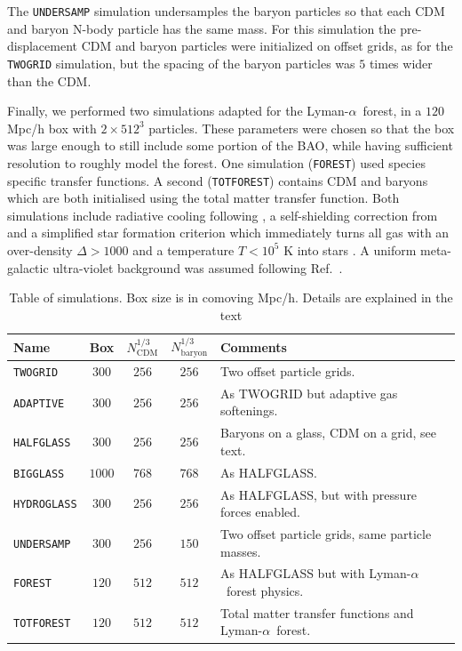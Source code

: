 \documentclass[a4paper,11pt]{article}
\newcommand{\Lya}{Lyman-$\alpha$}
\begin{document}
The \texttt{UNDERSAMP} simulation undersamples the baryon particles so that each CDM and baryon N-body particle has the same mass. For this simulation the pre-displacement CDM and baryon particles were initialized on offset grids, as for the \texttt{TWOGRID} simulation, but the spacing of the baryon particles was $5$ times wider than the CDM.

Finally, we performed two simulations adapted for the \Lya~forest, in a $120$ Mpc/h box with $2\times 512^3$ particles. These parameters were chosen so that the box was large enough to still include some portion of the BAO, while having sufficient resolution to roughly model the forest. One simulation (\texttt{FOREST}) used species specific transfer functions. A second (\texttt{TOTFOREST}) contains CDM and baryons which are both initialised using the total matter transfer function. Both simulations include radiative cooling following \cite{Katz:1996}, a self-shielding correction from \cite{Rahmati:2013} and a simplified star formation criterion which immediately turns all gas with an over-density $\Delta > 1000$ and a temperature $T < 10^5$ K into stars \cite{Viel:2004}. A uniform meta-galactic ultra-violet background was assumed following Ref.~\cite{Puchwein:2018}.

\begin{table}
\begin{center}
\begin{tabular}{|l|c|c|c|l|}
\hline
Name & Box & $N_\mathrm{CDM}^{1/3}$ & $N_\mathrm{baryon}^{1/3}$ & Comments  \\
\hline
\texttt{TWOGRID}    &   $300$ & $256$ & $256$ & Two offset particle grids. \\
\texttt{ADAPTIVE}    &   $300$ & $256$ & $256$ & As TWOGRID but adaptive gas softenings. \\
\texttt{HALFGLASS}  &   $300$ & $256$ & $256$ & Baryons on a glass, CDM on a grid, see text. \\
\texttt{BIGGLASS}  &   $1000$ & $768$ & $768$ & As HALFGLASS. \\
\texttt{HYDROGLASS}  &   $300$ & $256$ & $256$ & As HALFGLASS, but with pressure forces enabled. \\
\texttt{UNDERSAMP}  &   $300$ & $256$ & $150$ & Two offset particle grids, same particle masses. \\
\texttt{FOREST}  &   $120$ & $512$ & $512$ & As HALFGLASS but with \Lya~forest physics. \\
\texttt{TOTFOREST}  &   $120$ & $512$ & $512$ & Total matter transfer functions and \Lya~forest. \\
\hline
\end{tabular}
\end{center}
\caption{Table of simulations. Box size is in comoving Mpc/h. Details are explained in the text}
\label{tab:simulations}
\end{table}
\end{document}
